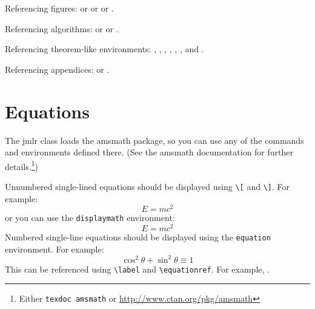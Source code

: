 \documentclass[pmlr,twocolumn,10pt]{jmlr} %
\begin{document}
Referencing figures:  or
 or
 or
.

Referencing algorithms:  or
 or
.

Referencing theorem-like environments: ,
, , 
, ,
,  and
.

Referencing appendices:  or
.

\section{Equations}
\label{sec:math}

The \textsf{jmlr} class loads the \textsf{amsmath} package, so
you can use any of the commands and environments defined there.
(See the \textsf{amsmath} documentation for further
details.\footnote{Either \texttt{texdoc amsmath} or
\url{http://www.ctan.org/pkg/amsmath}})

Unnumbered single-lined equations should be displayed using
\verb|\[| and \verb|\]|. For example:
\[E = m c^2\]
or you can use the \texttt{displaymath} environment:
\begin{displaymath}
E = m c^2
\end{displaymath}
Numbered single-line equations should be displayed using the
\texttt{equation} environment. For example:
\begin{equation}\label{eq:trigrule}
\cos^2\theta + \sin^2\theta \equiv 1
\end{equation}
This can be referenced using \verb|\label| and \verb|\equationref|.
For example, .
\end{document}

